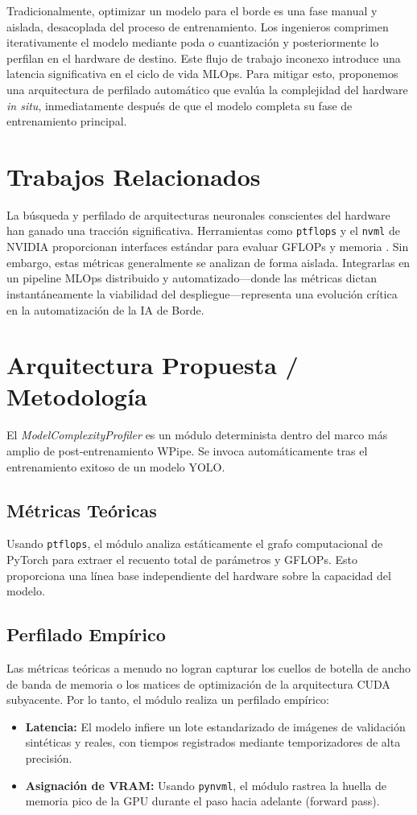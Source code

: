 \documentclass[conference]{IEEEtran}
\begin{document}
Tradicionalmente, optimizar un modelo para el borde es una fase manual y aislada, desacoplada del proceso de entrenamiento. Los ingenieros comprimen iterativamente el modelo mediante poda o cuantización y posteriormente lo perfilan en el hardware de destino. Este flujo de trabajo inconexo introduce una latencia significativa en el ciclo de vida MLOps. Para mitigar esto, proponemos una arquitectura de perfilado automático que evalúa la complejidad del hardware \textit{in situ}, inmediatamente después de que el modelo completa su fase de entrenamiento principal.

\section{Trabajos Relacionados}
La búsqueda y perfilado de arquitecturas neuronales conscientes del hardware han ganado una tracción significativa. Herramientas como \texttt{ptflops} y el \texttt{nvml} de NVIDIA proporcionan interfaces estándar para evaluar GFLOPs y memoria \cite{dollar2021fast}. Sin embargo, estas métricas generalmente se analizan de forma aislada. Integrarlas en un pipeline MLOps distribuido y automatizado—donde las métricas dictan instantáneamente la viabilidad del despliegue—representa una evolución crítica en la automatización de la IA de Borde.

\section{Arquitectura Propuesta / Metodología}
El \textit{ModelComplexityProfiler} es un módulo determinista dentro del marco más amplio de post-entrenamiento WPipe. Se invoca automáticamente tras el entrenamiento exitoso de un modelo YOLO.

\subsection{Métricas Teóricas}
Usando \texttt{ptflops}, el módulo analiza estáticamente el grafo computacional de PyTorch para extraer el recuento total de parámetros y GFLOPs. Esto proporciona una línea base independiente del hardware sobre la capacidad del modelo.

\subsection{Perfilado Empírico}
Las métricas teóricas a menudo no logran capturar los cuellos de botella de ancho de banda de memoria o los matices de optimización de la arquitectura CUDA subyacente. Por lo tanto, el módulo realiza un perfilado empírico:
\begin{itemize}
    \item \textbf{Latencia:} El modelo infiere un lote estandarizado de imágenes de validación sintéticas y reales, con tiempos registrados mediante temporizadores de alta precisión.
    \item \textbf{Asignación de VRAM:} Usando \texttt{pynvml}, el módulo rastrea la huella de memoria pico de la GPU durante el paso hacia adelante (forward pass).
\end{itemize}
\end{document}
